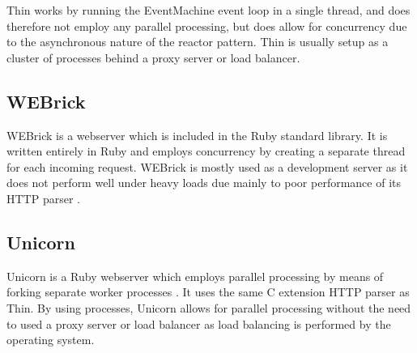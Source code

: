 Thin works by running the EventMachine event loop in a single thread, and
does therefore not employ any parallel processing, but does allow for
concurrency due to the asynchronous nature of the reactor pattern. Thin is
usually setup as a cluster of processes behind a proxy server or load
balancer.

\subsection{WEBrick}
WEBrick is a webserver which is included in the Ruby standard library. It is
written entirely in Ruby and employs concurrency by creating a separate thread
for each incoming request. WEBrick is mostly used as a development
server as it does not perform well under heavy loads due mainly to poor
performance of its HTTP parser \cite{webrick}.

\subsection{Unicorn}
Unicorn is a Ruby webserver which employs parallel processing by means of
forking separate worker processes \cite{unicorndocs}. It uses the same
C extension HTTP parser as Thin. By using processes, Unicorn allows for parallel
processing without the need to used a proxy server or load balancer as load
balancing is performed by the operating system.

